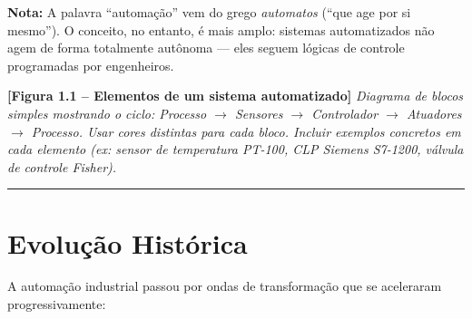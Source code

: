 \begin{caixanota}

\textbf{Nota:} A palavra ``automação'' vem do grego \emph{automatos} (``que age por si mesmo''). O conceito, no entanto, é mais amplo: sistemas automatizados não agem de forma totalmente autônoma --- eles seguem lógicas de controle programadas por engenheiros.

\end{caixanota}

\begin{caixafigura}

\textbf{{[}Figura 1.1 -- Elementos de um sistema automatizado{]}}
\emph{Diagrama de blocos simples mostrando o ciclo: Processo \ensuremath{\rightarrow} Sensores \ensuremath{\rightarrow} Controlador \ensuremath{\rightarrow} Atuadores \ensuremath{\rightarrow} Processo. Usar cores distintas para cada bloco. Incluir exemplos concretos em cada elemento (ex: sensor de temperatura PT-100, CLP Siemens S7-1200, válvula de controle Fisher).}

\end{caixafigura}

\begin{center}\rule{0.5\linewidth}{0.5pt}\end{center}

\section{Evolução Histórica}\label{evoluuxe7uxe3o-histuxf3rica}

A automação industrial passou por ondas de transformação que se aceleraram progressivamente:

